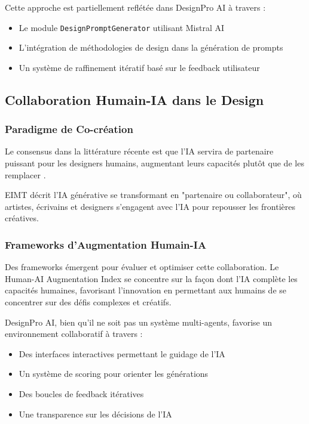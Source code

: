 Cette approche est partiellement reflétée dans DesignPro AI à travers :
\begin{itemize}[leftmargin=*]
    \item Le module \texttt{DesignPromptGenerator} utilisant Mistral AI
    \item L'intégration de méthodologies de design dans la génération de prompts
    \item Un système de raffinement itératif basé sur le feedback utilisateur
\end{itemize}

\subsection{Collaboration Humain-IA dans le Design}

\subsubsection{Paradigme de Co-création}

Le consensus dans la littérature récente est que l'IA servira de partenaire puissant pour les designers humains, augmentant leurs capacités plutôt que de les remplacer \cite{bartlett2024generative, elmontassir2024leveraging}.

EIMT \cite{eimt2025future} décrit l'IA générative se transformant en "partenaire ou collaborateur", où artistes, écrivains et designers s'engagent avec l'IA pour repousser les frontières créatives.

\subsubsection{Frameworks d'Augmentation Humain-IA}

Des frameworks émergent pour évaluer et optimiser cette collaboration. Le Human-AI Augmentation Index \cite{friendsofeurope2025} se concentre sur la façon dont l'IA complète les capacités humaines, favorisant l'innovation en permettant aux humains de se concentrer sur des défis complexes et créatifs.

DesignPro AI, bien qu'il ne soit pas un système multi-agents, favorise un environnement collaboratif à travers :
\begin{itemize}[leftmargin=*]
    \item Des interfaces interactives permettant le guidage de l'IA
    \item Un système de scoring pour orienter les générations
    \item Des boucles de feedback itératives
    \item Une transparence sur les décisions de l'IA
\end{itemize}

